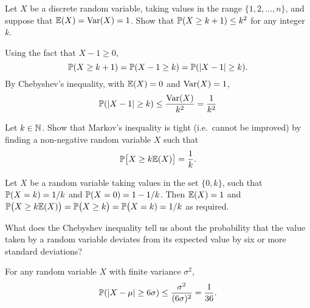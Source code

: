 \begin{exercise}
\begin{questions}
\question
Let $X$ be a discrete random variable, taking values in the range $\{1,2,\ldots,n\}$, and suppose that $\mathbb{E}(X)=\text{Var}(X)=1$. Show that $\mathbb{P}(X \geq k + 1) \leq k^2$ for any integer $k$.
\begin{answer} %
Using the fact that $X-1\geq 0$,
\[
\mathbb{P}(X\geq k+1) = \mathbb{P}(X-1\geq k) = \mathbb{P}(|X-1|\geq k).
\]
By Chebyshev's inequality, with $\mathbb{E}(X)=0$ and $\text{Var}(X)=1$,
\[
\mathbb{P}(|X-1|\geq k) \leq \frac{\text{Var}(X)}{k^2} = \frac{1}{k^2}
\]
\end{answer}

\question
Let $k\in\mathbb{N}$. Show that Markov's inequality is tight (i.e.\ cannot be improved) by finding a non-negative random variable $X$ such that
\[
\mathbb{P}\big[X\geq k\mathbb{E}(X)\big] = \frac{1}{k}.
\]
\begin{answer} %
Let $X$ be a random variable taking values in the set $\{0,k\}$, such that $\mathbb{P}(X=k)=1/k$ and $\mathbb{P}(X=0)=1-1/k$. Then $\mathbb{E}(X)=1$ and $\mathbb{P}\big(X\geq k\mathbb{E}(X)\big) = \mathbb{P}\big(X\geq k\big) = \mathbb{P}\big(X=k) = 1/k$ as required.
\end{answer}





\question
What does the Chebyshev inequality tell us about the probability that the value taken by a random variable deviates from its expected value by six or more standard deviations?
\begin{answer}
For any random variable $X$ with finite variance $\sigma^2$,
\[
\mathbb{P}(|X-\mu|\geq 6\sigma) \leq \frac{\sigma^2}{(6\sigma)^2} = \frac{1}{36}.
\]
\end{answer}



\end{questions}
\end{exercise}
